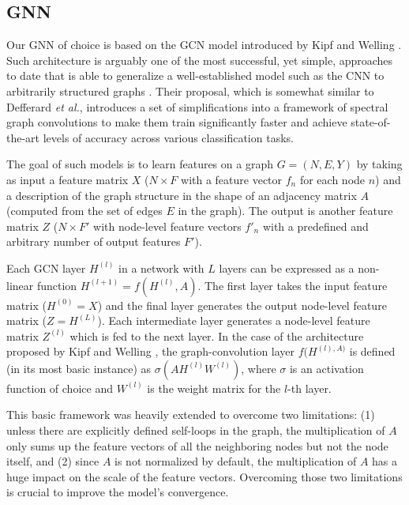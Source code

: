 \clearpage

\subsection{\acl{GNN}}
\label{cha:tactile:sec:tactilegcn:subsec:gnn}

Our \acf{GNN} of choice is based on the \acf{GCN} model introduced by Kipf and Welling \cite{Kipf2016}. Such architecture is arguably one of the most successful, yet simple, approaches to date that is able to generalize a well-established model such as the \ac{CNN} to arbitrarily structured graphs \cite{Bronstein2017}\cite{Schlichtkrull2018}. Their proposal, which is somewhat similar to Defferard \emph{et al.}\cite{Defferrard2016}, introduces a set of simplifications into a framework of spectral graph convolutions to make them train significantly faster and achieve state-of-the-art levels of accuracy across various classification tasks.

The goal of such models is to learn features on a graph $G = (N, E, Y)$ by taking as input a feature matrix $X$ ($N \times F$ with a feature vector $f_n$ for each node $n$) and a description of the graph structure in the shape of an adjacency matrix $A$ (computed from the set of edges $E$ in the graph). The output is another feature matrix $Z$ ($N \times F'$ with node-level feature vectors $f'_n$ with a predefined and arbitrary number of output features $F'$).

Each \ac{GCN} layer $H^(l)$ in a network with $L$ layers can be expressed as a non-linear function $H^{(l+1)} = f(H^{(l)}, A)$. The first layer takes the input feature matrix ($H^{(0)} = X$) and the final layer generates the output node-level feature matrix ($Z = H^{(L)}$). Each intermediate layer generates a node-level feature matrix $Z^{(l)}$ which is fed to the next layer. In the case of the architecture proposed by Kipf and Welling \cite{Kipf2016}, the graph-convolution layer $f(H^{(l), A)}$ is defined (in its most basic instance) as $\sigma(AH^{(l)}W^{(l)})$, where $\sigma$ is an activation function of choice and $W^{(l)}$ is the weight matrix for the $l$-th layer.

This basic framework was heavily extended to overcome two limitations\cite{Kipf2016}: (1) unless there are explicitly defined self-loops in the graph, the multiplication of $A$ only sums up the feature vectors of all the neighboring nodes but not the node itself, and (2) since $A$ is not normalized by default, the multiplication of $A$ has a huge impact on the scale of the feature vectors. Overcoming those two limitations is crucial to improve the model's convergence.

